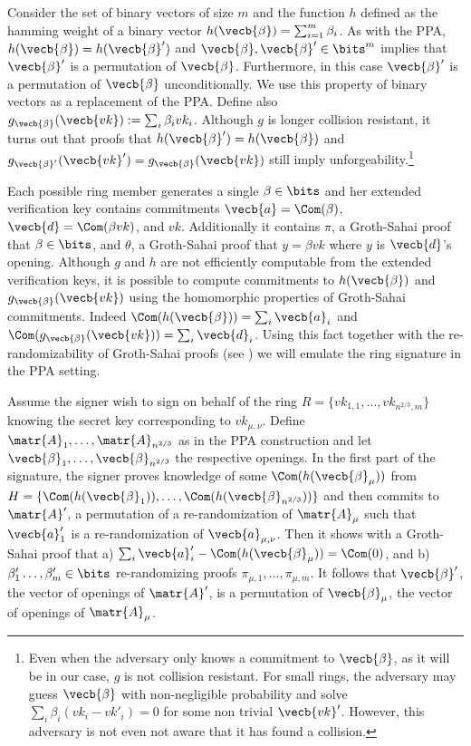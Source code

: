 Consider the set of binary vectors of size $m$ and the function $h$ defined as the hamming weight of a binary vector $h(\vecb{\beta}) = \sum_{i=1}^m \beta_i$.  As with the PPA, $h(\vecb{\beta})=h(\vecb{\beta}')$ and $\vecb{\beta},\vecb{\beta}'\in\bits^m$ implies that $\vecb{\beta}'$ is a permutation of $\vecb{\beta}$. Furthermore, in this case $\vecb{\beta}'$ is a permutation of $\vecb{\beta}$ unconditionally.
We use this property of binary vectors as a replacement of the PPA.
Define also $g_\vecb{\beta}(\vecb{vk}) := \sum_i \beta_i vk_i$.
Although $g$ is longer collision resistant, it turns out that proofs that $h(\vecb{\beta}') = h(\vecb{\beta})$ and $g_{\vecb{\beta}'}(\vecb{vk}') = g_{\vecb{\beta}}(\vecb{vk})$ still imply unforgeability.\footnote{Even when the adversary only knows a commitment to $\vecb{\beta}$, as it will be in our case, $g$ is not collision resistant. For small rings, the adversary may guess $\vecb{\beta}$ with non-negligible probability and solve $\sum_i\beta_i(vk_i-vk'_i)=0$ for some non trivial $\vecb{vk}'$. However, this adversary is not even not aware that it has found a collision.}

Each possible ring member generates a single $\beta\in\bits$ and her extended verification key contains commitments $\vecb{a}=\Com(\beta)$, $\vecb{d} = \Com(\beta vk)$, and $vk$. Additionally it contains $\pi$, a Groth-Sahai proof that $\beta\in\bits$, and $\theta$, a Groth-Sahai proof that $y = \beta vk$ where $y$ is $\vecb{d}$'s opening.
Although $g$ and $h$ are not efficiently computable from the extended verification keys, it is possible to compute commitments to $h(\vecb{\beta})$ and $g_\vecb{\beta}(\vecb{vk})$ using the homomorphic properties of Groth-Sahai commitments. Indeed $\Com(h(\vecb{\beta})) = \sum_i \vecb{a}_i$ and $\Com(g_\vecb{\beta}(\vecb{vk})) = \sum_i \vecb{d}_i$. Using this fact together with the re-randomizability of Groth-Sahai proofs (see \cite{C:BCCKLS09}) we will emulate the ring signature in the PPA setting.

Assume the signer wish to sign on behalf of the ring $R=\{vk_{1,1},\ldots,vk_{n^{2/3},m}\}$ knowing the secret key corresponding to $vk_{\mu,\nu}$. Define $\matr{A}_1,\ldots,\matr{A}_{n^{2/3}}$ as in the PPA construction and let $\vecb{\beta}_1,\ldots,\vecb{\beta}_{n^{2/3}}$ the respective openings.
In the first part of the signature, the signer proves knowledge of some $\Com(h(\vecb{\beta}_\mu))$ from $H = \{\Com(h(\vecb{\beta}_1)),\ldots,\allowbreak\Com(h(\vecb{\beta}_{n^{2/3}}))\}$ and then commits to $\matr{A}'$, a permutation of a re-ran\-do\-mi\-za\-tion of $\matr{A}_\mu$ such that $\vecb{a}'_1$ is a re-randomization of $\vecb{a}_{\mu,\nu}$. Then it shows with a Groth-Sahai proof that a) $\sum_i \vecb{a}'_i - \Com(h(\vecb{\beta}_\mu)) = \Com(0)$, and b) $\beta'_1\ldots,\beta'_m\in\bits$ re-randomizing proofs $\pi_{\mu,1},\ldots,\pi_{\mu,m}$. It follows that $\vecb{\beta}'$, the vector of openings of $\matr{A}'$, is a permutation of $\vecb{\beta}_\mu$, the vector of openings of $\matr{A}_\mu$.

